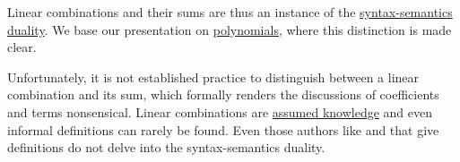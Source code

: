 \begin{comments}
  \item Linear combinations and their sums are thus an instance of the \hyperref[con:syntax_semantics_duality]{syntax-semantics duality}. We base our presentation on \hyperref[def:polynomial_algebra]{polynomials}, where this distinction is made clear.

  Unfortunately, it is not established practice to distinguish between a linear combination and its sum, which formally renders the discussions of coefficients and terms nonsensical. Linear combinations are \hyperref[con:assumed_knowledge]{assumed knowledge} and even informal definitions can rarely be found. Even those authors like  and  that give definitions do not delve into the syntax-semantics duality.
\end{comments}

